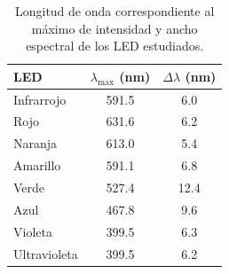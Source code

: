 \begin{table}[htbp]
\centering
\caption{Resultados del ajuste lineal para la determinación de $h/e$.}
\label{tab:ajuste_he}

\scriptsize
{}
\end{table}

\begin{table}[htbp]
    \centering
    \caption{Longitud de onda correspondiente al máximo de intensidad
    y ancho espectral de los LED estudiados.}
    \label{tab:longitudes_onda_led}
    \small
    \setlength{\tabcolsep}{4pt}
    \begin{tabular}{lcc}
        \toprule
        LED
        & $\lambda_{\max}$ (\si{\nano\meter})
        & $\Delta\lambda$ (\si{\nano\meter}) \\
        \midrule
        Infrarrojo & 591.5 &  6.0  \\
        Rojo       & 631.6 &  6.2  \\
        Naranja    & 613.0 &  5.4  \\
        Amarillo   & 591.1 &  6.8  \\
        Verde      & 527.4 &  12.4 \\
        Azul       & 467.8 &  9.6  \\
        Violeta    & 399.5 &  6.3  \\
        Ultravioleta & 399.5 & 6.2 \\
        \bottomrule
    \end{tabular}
\end{table}
\newpage